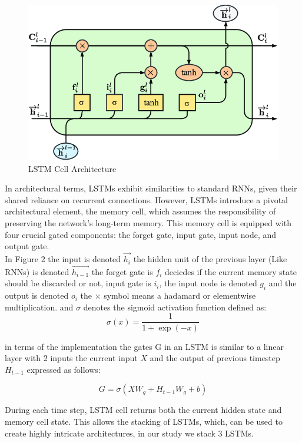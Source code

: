 \documentclass{article}
\begin{document}
\begin{figure}
    \centering
    \includegraphics[width=0.5\linewidth]{LSTM.png}
    \caption{LSTM Cell Architecture}
    \label{fig:LSTM Diagram}
\end{figure}

In architectural terms, LSTMs exhibit similarities to standard RNNs, given their shared reliance on recurrent connections. However, LSTMs introduce a pivotal architectural element, the memory cell, which assumes the responsibility of preserving the network's long-term memory. This memory cell is equipped with four crucial gated components: the forget gate, input gate, input node, and output gate. \\

In Figure 2 the input is denoted $\Vec{h_i}$ the hidden unit of the previous layer (Like RNNs) is denoted $\vec{h_{i-1}}$ the forget gate is $f_i$ decicdes if the current memory state should be discarded or not, input gate is $i_i$, the input node is denoted $g_i$ and the output is denoted $o_i$ the $\times$ symbol means a hadamard or elementwise multiplication. and $\sigma$ denotes the sigmoid activation function defined as:\\

\begin{equation}
    \sigma(x) = \frac{1}{1+\exp(-x)}
\end{equation}

in terms of the implementation the gates G in an LSTM is similar to a linear layer with 2 inputs the current input $X$ and the output of previous timestep $H_{t-1}$ expressed as follows:

\begin{equation}
    G = \sigma(XW_g + H_{t-1}W_g + b)
\end{equation}

During each time step, LSTM cell returns both the current hidden state and memory cell state. This allows the stacking of LSTMs, which, can be used to create highly intricate architectures, in our study we stack 3 LSTMs.\\
\end{document}
